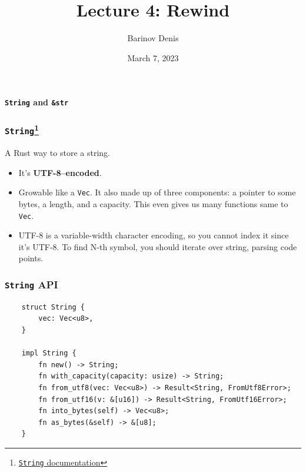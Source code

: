 \documentclass[aspectratio=1610,t]{beamer}
\title{Lecture 4: Rewind}
\date{March 7, 2023}
\author{Barinov Denis}
\institute{barinov.diu@gmail.com}
\begin{document}

\begin{frame}
\maketitle
\end{frame}

\begin{frame}[c]
\centering\Huge\textbf{\texttt{String} and \texttt{\&str}}
\end{frame}


\begin{frame}[fragile]
\frametitle{\texttt{String}\footnote{\href{https://doc.rust-lang.org/std/string/struct.String.html}{\texttt{String} documentation}}}
A Rust way to store a string.

\begin{itemize}
    \item<2-> It's \textbf{UTF-8–encoded}.
    \item<3-> Growable like a \texttt{Vec}. It also made up of three components: a pointer to some bytes, a length, and a capacity. This even gives us many functions same to \texttt{Vec}.
    \item<4-> UTF-8 is a variable-width character encoding, so you cannot index it since it's UTF-8. To find N-th symbol, you should iterate over string, parsing code points.
\end{itemize}
\end{frame}


\begin{frame}[fragile,c]
\frametitle{\texttt{String} API}
\begin{verbatim}
    struct String {
        vec: Vec<u8>,
    }

    impl String {
        fn new() -> String;
        fn with_capacity(capacity: usize) -> String;
        fn from_utf8(vec: Vec<u8>) -> Result<String, FromUtf8Error>;
        fn from_utf16(v: &[u16]) -> Result<String, FromUtf16Error>;
        fn into_bytes(self) -> Vec<u8>;
        fn as_bytes(&self) -> &[u8];
    }
\end{verbatim}
\end{frame}
\end{document}

